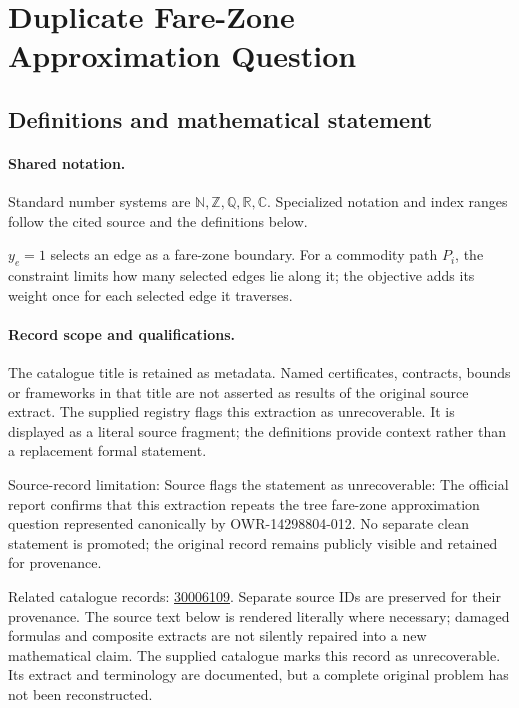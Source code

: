 \documentclass[11pt]{article}
\begin{document}
\section{Duplicate Fare-Zone Approximation Question}\label{statement}

\subsection{Definitions and mathematical statement}

\paragraph{Shared notation.}Standard number systems are $\mathbb N,\mathbb Z,\mathbb Q,\mathbb R,\mathbb C$. Specialized notation and index ranges follow the cited source and the definitions below.


$y_e=1$ selects an edge as a fare-zone boundary. For a commodity path $P_i$, the constraint limits how many selected edges lie along it; the objective adds its weight once for each selected edge it traverses.
\paragraph{Record scope and qualifications.}
The catalogue title is retained as metadata. Named certificates, contracts, bounds or frameworks in that title are not asserted as results of the original source extract.
The supplied registry flags this extraction as unrecoverable. It is displayed as a literal source fragment; the definitions provide context rather than a replacement formal statement.

Source-record limitation: Source flags the statement as unrecoverable: The official report confirms that this extraction repeats the tree fare-zone approximation question represented canonically by OWR-14298804-012. No separate clean statement is promoted; the original record remains publicly visible and retained for provenance.

Related catalogue records: \href{https://mehmetmars7.github.io/Erdosproblems-llm-hunter/problem.html?type=open_problems&id=30006109}{30006109}. Separate source IDs are preserved for their provenance.
The source text below is rendered literally where necessary; damaged formulas and composite extracts are not silently repaired into a new mathematical claim.
The supplied catalogue marks this record as unrecoverable. Its extract and terminology are documented, but a complete original problem has not been reconstructed.
\end{document}
